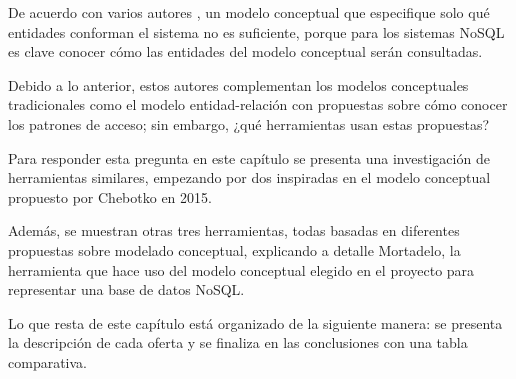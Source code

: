 De acuerdo con varios autores \cite{chebotko_big_2015,de_lima_workload-driven_2015,mior_nose_2017-1}, un modelo conceptual que especifique solo qué entidades conforman el sistema no es suficiente, porque para los sistemas NoSQL es clave conocer cómo las entidades del modelo conceptual serán consultadas.


Debido a lo anterior, estos autores complementan los modelos conceptuales tradicionales como el modelo entidad-relación con propuestas sobre cómo conocer los patrones de acceso; sin embargo, ¿qué herramientas usan estas propuestas?


Para responder esta pregunta en este capítulo se presenta una investigación de herramientas similares, empezando por dos inspiradas en el modelo conceptual propuesto por Chebotko en 2015.


Además, se muestran otras tres herramientas, todas basadas en diferentes propuestas sobre modelado conceptual, explicando a detalle Mortadelo, la herramienta que hace uso del modelo conceptual elegido en el proyecto para representar una base de datos NoSQL.


Lo que resta de este capítulo está organizado de la siguiente manera: se presenta la descripción de cada oferta y se finaliza en las conclusiones con una tabla comparativa.







